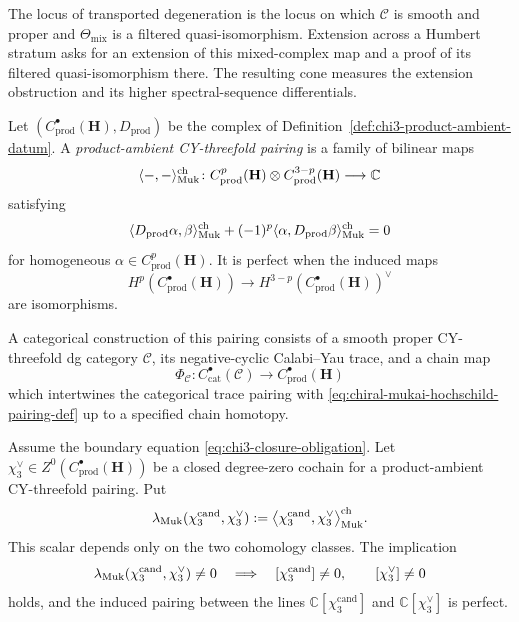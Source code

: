 \begin{remark}
\label{rem:chi-hodge-derham-humbert-obstruction}
The locus of transported degeneration is the locus on which
\(\mathcal C\) is smooth and proper and
\(\Theta_{\mathrm{mix}}\) is a filtered quasi-isomorphism.  Extension
across a Humbert stratum asks for an extension of this mixed-complex map
and a proof of its filtered quasi-isomorphism there.  The resulting
cone measures the extension obstruction and its higher spectral-sequence
differentials.
\end{remark}

\begin{definition}
\label{def:chiral-mukai-hochschild}
%
Let
\((C^\bullet_{\mathrm{prod}}(\mathbf H),D_{\mathrm{prod}})\)
be the complex of
Definition~\ref{def:chi3-product-ambient-datum}.  A
\emph{product-ambient CY-threefold pairing} is a family of bilinear maps
\begin{equation}
\label{eq:chiral-mukai-hochschild-pairing-def}
 \langle-,-\rangle_{\mathrm{Muk}}^{\mathrm{ch}}\colon
 C^p_{\mathrm{prod}}(\mathbf H)\otimes
 C^{3-p}_{\mathrm{prod}}(\mathbf H)\longrightarrow\mathbb C
\end{equation}
satisfying
\[
 \langle D_{\mathrm{prod}}\alpha,\beta\rangle_{\mathrm{Muk}}^{\mathrm{ch}}
 +(-1)^p
 \langle\alpha,D_{\mathrm{prod}}\beta\rangle_{\mathrm{Muk}}^{\mathrm{ch}}=0
\]
for homogeneous \(\alpha\in C^p_{\mathrm{prod}}(\mathbf H)\).  It is
perfect when the induced maps
\[
 H^p(C^\bullet_{\mathrm{prod}}(\mathbf H))
 \longrightarrow
 H^{3-p}(C^\bullet_{\mathrm{prod}}(\mathbf H))^\vee
\]
are isomorphisms.

A categorical construction of this pairing consists of a smooth proper
CY-threefold dg category \(\mathcal C\), its negative-cyclic
Calabi--Yau trace, and a chain map
\[
 \Phi_{\mathcal C}\colon
 C^\bullet_{\mathrm{cat}}(\mathcal C)
 \longrightarrow C^\bullet_{\mathrm{prod}}(\mathbf H)
\]
which intertwines the categorical trace pairing with
\eqref{eq:chiral-mukai-hochschild-pairing-def} up to a specified chain
homotopy.
\end{definition}

\begin{theorem}
\label{thm:chi3-mukai-hochschild-pairing}
\ClaimStatusProvedHere
Assume the boundary equation
\eqref{eq:chi3-closure-obligation}.  Let
\(\chi_3^\vee\in Z^0(C^\bullet_{\mathrm{prod}}(\mathbf H))\)
be a closed degree-zero cochain for a product-ambient CY-threefold
pairing.  Put
\begin{equation}
\label{eq:chiral-mukai-hochschild-value}
 \lambda_{\mathrm{Muk}}(\chi_3^{\mathrm{cand}},\chi_3^\vee)
 :=
 \bigl\langle
 \chi_3^{\mathrm{cand}},\chi_3^\vee
 \bigr\rangle_{\mathrm{Muk}}^{\mathrm{ch}}.
\end{equation}
This scalar depends only on the two cohomology classes.  The implication
\[
 \lambda_{\mathrm{Muk}}(\chi_3^{\mathrm{cand}},\chi_3^\vee)\ne0
 \quad\Longrightarrow\quad
 [\chi_3^{\mathrm{cand}}]\ne0,\qquad
 [\chi_3^\vee]\ne0
\]
holds, and the induced pairing between the lines
\(\mathbb C[\chi_3^{\mathrm{cand}}]\) and
\(\mathbb C[\chi_3^\vee]\) is perfect.
\end{theorem}

